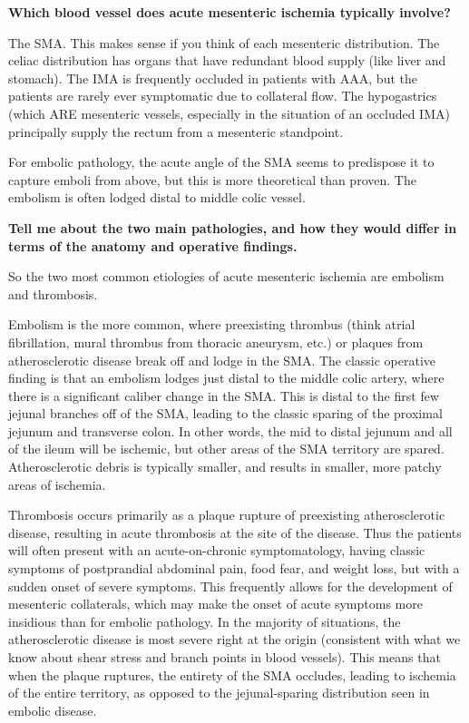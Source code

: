 \documentclass[
]{book}
\begin{document}
\textbf{Which blood vessel does acute mesenteric ischemia typically involve?}

The SMA. This makes sense if you think of each mesenteric distribution.
The celiac distribution has organs that have redundant blood supply
(like liver and stomach). The IMA is frequently occluded in patients
with AAA, but the patients are rarely ever symptomatic due to collateral
flow. The hypogastrics (which ARE mesenteric vessels, especially in the
situation of an occluded IMA) principally supply the rectum from a
mesenteric standpoint.

For embolic pathology, the acute angle of the SMA seems to predispose it
to capture emboli from above, but this is more theoretical than proven.
The embolism is often lodged distal to middle colic
vessel.\citep{wyersmarkcandmartin133AcuteMesenteric2019, kazmersOperativeManagementAcute1998}

\textbf{Tell me about the two main pathologies, and how they would differ in
terms of the anatomy and operative findings.}

So the two most common etiologies of acute mesenteric ischemia are
embolism and thrombosis.~

Embolism is the more common, where preexisting thrombus (think atrial
fibrillation, mural thrombus from thoracic aneurysm, etc.) or plaques
from atherosclerotic disease break off and lodge in the SMA. The classic
operative finding is that an embolism lodges just distal to the middle
colic artery, where there is a significant caliber change in the SMA.
This is distal to the first few jejunal branches off of the SMA, leading
to the classic sparing of the proximal jejunum and transverse colon. In
other words, the mid to distal jejunum and all of the ileum will be
ischemic, but other areas of the SMA territory are spared.
Atherosclerotic debris is typically smaller, and results in smaller,
more patchy areas of ischemia.

Thrombosis occurs primarily as a plaque rupture of preexisting
atherosclerotic disease, resulting in acute thrombosis at the site of
the disease. Thus the patients will often present with an
acute-on-chronic symptomatology, having classic symptoms of postprandial
abdominal pain, food fear, and weight loss, but with a sudden onset of
severe symptoms. This frequently allows for the development of
mesenteric collaterals, which may make the onset of acute symptoms more
insidious than for embolic pathology. In the majority of situations, the
atherosclerotic disease is most severe right at the origin (consistent
with what we know about shear stress and branch points in blood
vessels). This means that when the plaque ruptures, the entirety of the
SMA occludes, leading to ischemia of the entire territory, as opposed to
the jejunal-sparing distribution seen in embolic disease.
\end{document}

